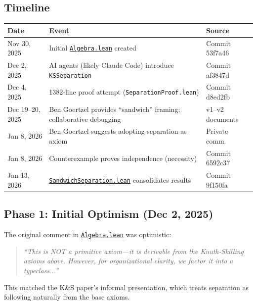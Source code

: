\documentclass[11pt]{article}
\theoremstyle{definition}
\theoremstyle{remark}
\begin{document}
\subsection*{Timeline}

\begin{center}
\begin{tabular}{lll}
\toprule
\textbf{Date} & \textbf{Event} & \textbf{Source} \\
\midrule
Nov 30, 2025 & Initial \href{https://github.com/zariuq/ks-foundations-of-inference/blob/main/KnuthSkilling/Core/Algebra.lean}{\texttt{Algebra.lean}} created & Commit 53f7a46 \\
Dec 2, 2025 & AI agents (likely Claude Code) introduce \texttt{KSSeparation} & Commit af3847d \\
Dec 4, 2025 & 1382-line proof attempt (\texttt{SeparationProof.lean}) & Commit d8ed2fb \\
Dec 19--20, 2025 & Ben Goertzel provides ``sandwich'' framing; collaborative debugging & v1--v2 documents \\
Jan 8, 2026 & Ben Goertzel suggests adopting separation as axiom & Private comm. \\
Jan 8, 2026 & Counterexample proves independence (necessity) & Commit 6592c37 \\
Jan 13, 2026 & \href{https://github.com/zariuq/ks-foundations-of-inference/blob/main/KnuthSkilling/Additive/Axioms/SandwichSeparation.lean}{\texttt{SandwichSeparation.lean}} consolidates results & Commit 9f150fa \\
\bottomrule
\end{tabular}
\end{center}

\subsection*{Phase 1: Initial Optimism (Dec 2, 2025)}

The original comment in \href{https://github.com/zariuq/ks-foundations-of-inference/blob/main/KnuthSkilling/Core/Algebra.lean}{\texttt{Algebra.lean}} was optimistic:

\begin{quote}
\textit{``This is NOT a primitive axiom---it is derivable from the Knuth-Skilling axioms above.
However, for organizational clarity, we factor it into a typeclass...''}
\end{quote}

This matched the K\&S paper's informal presentation, which treats separation as following
naturally from the base axioms.
\end{document}
